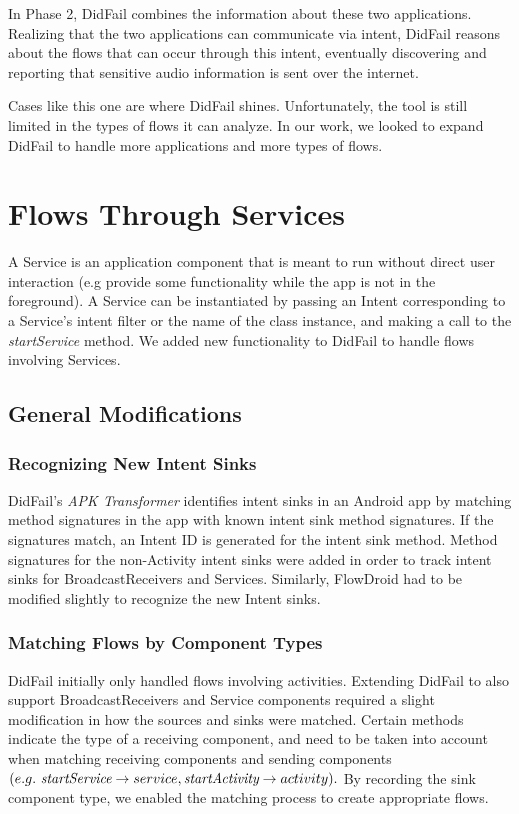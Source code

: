 In Phase 2, DidFail combines the information about these two applications. Realizing that the two applications can communicate via intent, DidFail reasons about the flows that can occur through this intent, eventually discovering and reporting that sensitive audio information is sent over the internet. 

Cases like this one are where DidFail shines. Unfortunately, the tool is still limited in the types of flows it can analyze. In our work, we looked to expand DidFail to handle more applications and more types of flows.


\section{Flows Through Services}
A Service is an application component that is meant to run without direct user interaction (e.g provide some functionality while the app is not in the foreground). A Service can be instantiated by passing an Intent corresponding to a Service's intent filter or the name of the class instance, and making a call to the \emph{startService} method. We added new functionality to DidFail to handle flows involving Services.  

\subsection{General Modifications}
\subsubsection{Recognizing New Intent Sinks}
DidFail's \emph{APK Transformer} identifies intent sinks in an Android app by matching method signatures in the app with known intent sink method signatures. If the signatures match, an Intent ID is generated for the intent sink method. Method signatures for the non-Activity intent sinks were added in order to track intent sinks for BroadcastReceivers and Services. Similarly, FlowDroid had to be modified slightly to recognize the new Intent sinks. 

\subsubsection{Matching Flows by Component Types}
DidFail initially only handled flows involving activities. Extending DidFail to also support BroadcastReceivers and Service components required a slight modification in how the sources and sinks were matched. Certain methods indicate the type of a receiving component, and need to be taken into account when matching receiving components and sending components $(e.g.\  \emph{startService} \rightarrow service, \emph{startActivity} \rightarrow activity).$ By recording the sink component type, we enabled the matching process to create appropriate flows.


